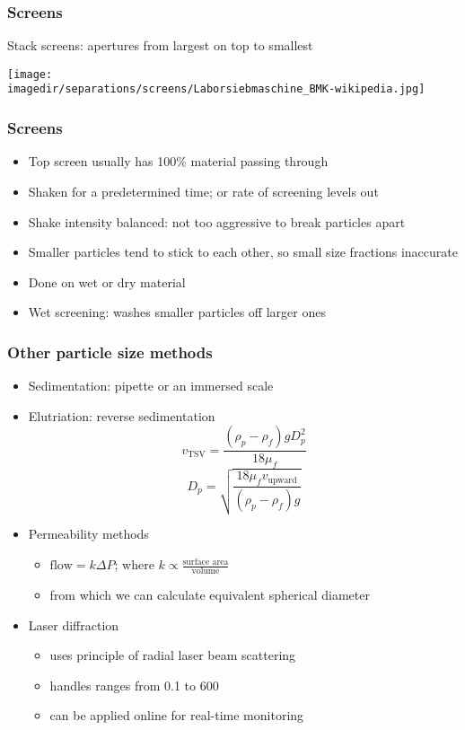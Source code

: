 \begin{frame}\frametitle{Screens}
	Stack screens: apertures from largest on top to smallest
	\begin{center}
		\texttt{[image: \\imagedir/separations/screens/Laborsiebmaschine\_BMK-wikipedia.jpg]}
	\end{center}
\end{frame}

\begin{frame}\frametitle{Screens}
	\begin{itemize}
		\item	Top screen usually has 100\% material passing through
		\item	Shaken for a predetermined time; or rate of screening levels out
		\item	Shake intensity balanced: not too aggressive to break particles apart
		\item	Smaller particles tend to stick to each other, so small size fractions inaccurate
		\item	Done on wet or dry material
		\item	Wet screening: washes smaller particles off larger ones
	\end{itemize}
\end{frame}

\begin{frame}\frametitle{Other particle size methods}
	\begin{itemize}		
		\item	Sedimentation: pipette or an immersed scale 
		\item	Elutriation: reverse sedimentation
				\[
					v_\text{TSV} = \frac{\left( \rho_p - \rho_f \right) g D_p^2}{18 \mu_f} 
				\]
				\[
					D_p = \sqrt{\frac{ 18 \mu_f v_\text{upward}}{\left( \rho_p - \rho_f \right) g} }					
				\]
		\item	Permeability methods
			\begin{itemize}
				\item	$\text{flow} = k \Delta P$; where $k \propto \displaystyle \frac{\text{surface area}}{\text{volume}}$ 
				\item	from which we can calculate equivalent spherical diameter
			\end{itemize}
		\item	Laser diffraction
			\begin{itemize}
				\item	uses principle of radial laser beam scattering
				\item	handles ranges from 0.1 to 600 \micron
				\item	can be applied online for real-time monitoring
			\end{itemize}
	\end{itemize}
\end{frame}

